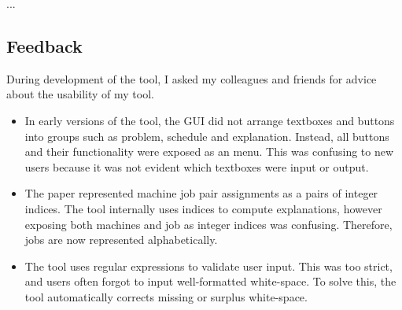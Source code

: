 ...

\subsection{Feedback}

During development of the tool, I asked my colleagues and friends for advice about the usability of my tool.

\begin{itemize}
	\item In early versions of the tool, the GUI did not arrange textboxes and buttons into groups such as problem, schedule and explanation. Instead, all buttons and their functionality were exposed as an menu. This was confusing to new users because it was not evident which textboxes were input or output.
	\item The paper \cite{aes} represented machine job pair assignments as a pairs of integer indices. The tool internally uses indices to compute explanations, however exposing both machines and job as integer indices was confusing. Therefore, jobs are now represented alphabetically.
	\item The tool uses regular expressions to validate user input. This was too strict, and users often forgot to input well-formatted white-space. To solve this, the tool automatically corrects missing or surplus white-space.
\end{itemize}